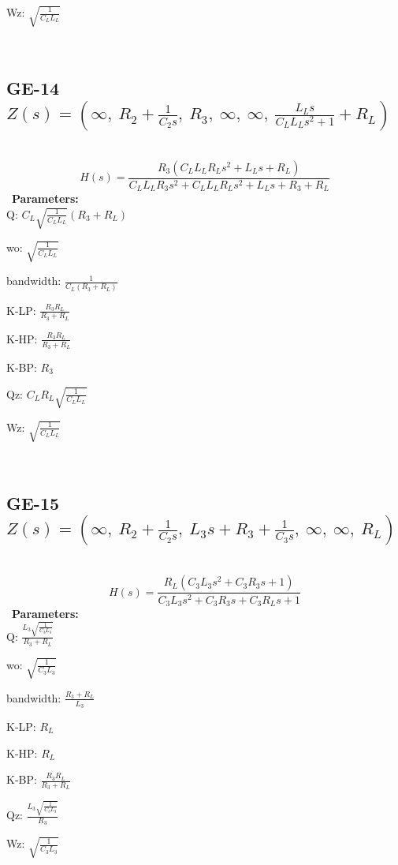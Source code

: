 \documentclass{article}
\begin{document}
Wz: $\sqrt{\frac{1}{C_{L} L_{L}}}$\ 

\ 

\subsection{GE-14 $Z(s) = \left( \infty, \  R_{2} + \frac{1}{C_{2} s}, \  R_{3}, \  \infty, \  \infty, \  \frac{L_{L} s}{C_{L} L_{L} s^{2} + 1} + R_{L}\right)$ } \ 
\textbf{\[H(s) = \frac{R_{3} \left(C_{L} L_{L} R_{L} s^{2} + L_{L} s + R_{L}\right)}{C_{L} L_{L} R_{3} s^{2} + C_{L} L_{L} R_{L} s^{2} + L_{L} s + R_{3} + R_{L}}\] } \ 
\textbf{Parameters:}\\ 

Q: $C_{L} \sqrt{\frac{1}{C_{L} L_{L}}} \left(R_{3} + R_{L}\right)$\ 

wo: $\sqrt{\frac{1}{C_{L} L_{L}}}$\ 

bandwidth: $\frac{1}{C_{L} \left(R_{3} + R_{L}\right)}$\ 

K-LP: $\frac{R_{3} R_{L}}{R_{3} + R_{L}}$\ 

K-HP: $\frac{R_{3} R_{L}}{R_{3} + R_{L}}$\ 

K-BP: $R_{3}$\ 

Qz: $C_{L} R_{L} \sqrt{\frac{1}{C_{L} L_{L}}}$\ 

Wz: $\sqrt{\frac{1}{C_{L} L_{L}}}$\ 

\ 

\subsection{GE-15 $Z(s) = \left( \infty, \  R_{2} + \frac{1}{C_{2} s}, \  L_{3} s + R_{3} + \frac{1}{C_{3} s}, \  \infty, \  \infty, \  R_{L}\right)$ } \ 
\textbf{\[H(s) = \frac{R_{L} \left(C_{3} L_{3} s^{2} + C_{3} R_{3} s + 1\right)}{C_{3} L_{3} s^{2} + C_{3} R_{3} s + C_{3} R_{L} s + 1}\] } \ 
\textbf{Parameters:}\\ 

Q: $\frac{L_{3} \sqrt{\frac{1}{C_{3} L_{3}}}}{R_{3} + R_{L}}$\ 

wo: $\sqrt{\frac{1}{C_{3} L_{3}}}$\ 

bandwidth: $\frac{R_{3} + R_{L}}{L_{3}}$\ 

K-LP: $R_{L}$\ 

K-HP: $R_{L}$\ 

K-BP: $\frac{R_{3} R_{L}}{R_{3} + R_{L}}$\ 

Qz: $\frac{L_{3} \sqrt{\frac{1}{C_{3} L_{3}}}}{R_{3}}$\ 

Wz: $\sqrt{\frac{1}{C_{3} L_{3}}}$\ 
\end{document}
